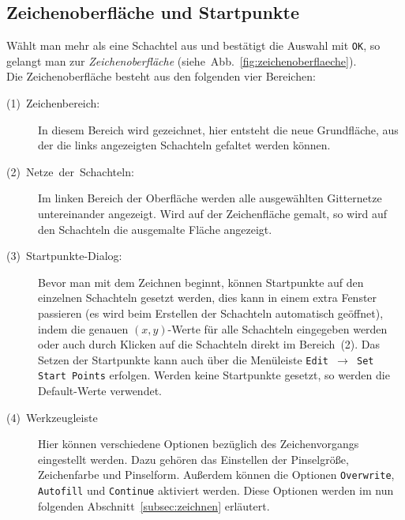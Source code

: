 \subsection{Zeichenoberfläche und Startpunkte}
\label{subsec:zeichenoberflaeche}

Wählt man mehr als eine Schachtel aus und bestätigt die Auswahl mit \texttt{OK}, so gelangt man zur \emph{Zeichenoberfläche} (siehe~Abb.~\ref{fig:zeichenoberflaeche}).\\

Die Zeichenoberfläche besteht aus den folgenden vier Bereichen:

  \begin{description}
    \item [{(1)~Zeichenbereich:}] In diesem Bereich wird gezeichnet, hier entsteht die neue Grundfläche, aus der die links angezeigten Schachteln gefaltet werden können.

    \item [(2)~Netze~der~Schachteln:] Im linken Bereich der Oberfläche werden alle ausgewählten Gitternetze untereinander angezeigt. Wird auf der Zeichenfläche gemalt, so wird auf den Schachteln die ausgemalte Fläche angezeigt.

    \item [(3)~Startpunkte-Dialog:] Bevor man mit dem Zeichnen beginnt, können Startpunkte auf den einzelnen Schachteln gesetzt werden, dies kann in einem extra Fenster passieren (es wird beim Erstellen der Schachteln automatisch geöffnet), indem die genauen $(x,y)$-Werte für alle Schachteln eingegeben werden oder auch durch Klicken auf die Schachteln direkt im Bereich~(2). Das Setzen der Startpunkte kann auch über die Menüleiste \texttt{Edit $\rightarrow$ Set Start Points} erfolgen. Werden keine Startpunkte gesetzt, so werden die Default-Werte verwendet.

    \item [(4)~Werkzeugleiste] Hier können verschiedene Optionen bezüglich des Zeichenvorgangs eingestellt werden. Dazu gehören das Einstellen der Pinselgröße, Zeichenfarbe und Pinselform. Außerdem können die Optionen \texttt{Overwrite}, \texttt{Autofill} und \texttt{Continue} aktiviert werden. Diese Optionen werden im nun folgenden Abschnitt~\ref{subsec:zeichnen} erläutert.
  \end{description}

